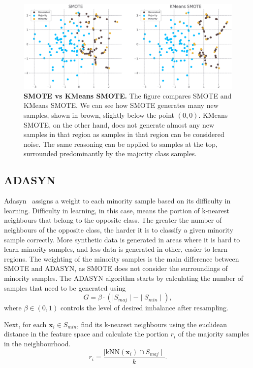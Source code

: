 \begin{figure}
    \centering
    \includegraphics[width=\linewidth]{figures/smote_vs_kmeanssmote.eps}
    \caption{
        \textbf{SMOTE vs KMeans SMOTE.} The figure compares SMOTE and KMeans SMOTE. We can see how
        SMOTE generates many new samples, shown in brown, slightly below the point $(0, 0)$. KMeans
        SMOTE, on the other hand, does not generate almost any new samples in that region as
        samples in that region can be considered noise. The same reasoning can be applied to
        samples at the top, surrounded predominantly by the majority class samples.
    }
    \label{figure:smote-vs-kmeanssmote}
\end{figure}


\subsection{ADASYN}
\label{subsection:adasyn}

Adasyn~\cite{adasyn} assigns a weight to each minority sample based on its difficulty in learning.
Difficulty in learning, in this case, means the portion of k-nearest neighbours that belong to the
opposite class. The greater the number of neighbours of the opposite class, the harder it is to
classify a given minority sample correctly. More synthetic data is generated in areas where it is
hard to learn minority samples, and less data is generated in other, easier-to-learn regions. The
weighting of the minority samples is the main difference between SMOTE and ADASYN, as SMOTE does
not consider the surroundings of minority samples. The ADASYN algorithm starts by calculating the
number of samples that need to be generated using
\begin{equation}
    G = \beta \cdot (\mid S_{maj} \mid - \mid S_{min} \mid),
\end{equation}
where $\beta \in (0, 1)$ controls the level of desired imbalance after resampling.

Next, for each $\mathbf{x}_i \in S_{min}$, find its k-nearest neighbours using the euclidean
distance in the feature space and calculate the portion $r_i$ of the majority samples in the
neighbourhood.
\begin{equation}
    r_i = \frac{\mid \mathrm{kNN}(\mathbf{x}_i) \cap S_{maj} \mid}{k}.
\end{equation}


